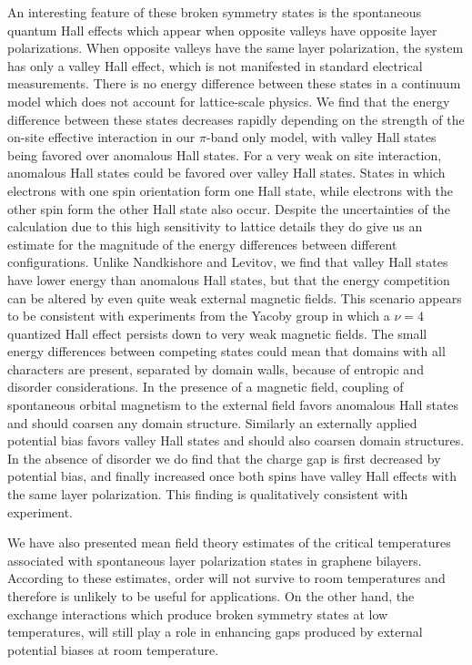 \documentclass[twocolumn,prb,showpacs,preprintnumbers,amsmath,amssymb]{revtex4}
\begin{document}
An interesting feature of these broken symmetry states is the spontaneous quantum 
Hall effects which appear when opposite valleys have opposite layer polarizations.\cite{xiaofan}
When opposite valleys have the same layer polarization, the system has only a valley Hall effect, which is not manifested in standard electrical measurements.  There is no energy difference between these states in a continuum model which does not account for lattice-scale physics.  We find that the energy difference between these states decreases rapidly depending on the strength of the on-site effective interaction in our $\pi$-band only model, with valley Hall states being favored over anomalous Hall states.  For a very weak on site interaction, anomalous Hall states could be favored over valley Hall states.  States in which electrons with one spin orientation form one Hall state, while electrons with the other spin form the other Hall state also occur.  
Despite the uncertainties of the calculation due to this high sensitivity to lattice details
they do give us an estimate for the magnitude of the energy differences between different configurations.
Unlike Nandkishore and Levitov, \cite{nandkishore2} we find that valley Hall states have lower energy than anomalous Hall states, but that the energy competition can be altered by even quite weak external magnetic fields.  This scenario appears to be consistent with experiments from the Yacoby group in which a $\nu=4$ quantized Hall effect persists down to very weak magnetic fields.   The small energy differences between competing states could mean that domains with all characters are present, separated by domain walls,  because of entropic and disorder considerations.  In the presence of a magnetic field, coupling of spontaneous orbital magnetism to the external field favors anomalous Hall states and should coarsen any domain structure.  Similarly an externally applied potential bias favors valley Hall states and should also coarsen domain structures.   In the absence of disorder we do find that the charge gap is first decreased by potential bias, and finally increased once both spins have valley Hall effects with the same layer polarization.  This finding is qualitatively consistent with experiment.   
\cite{yacoby_latest}



We have also presented mean field theory estimates of the critical temperatures associated with spontaneous layer polarization states in graphene bilayers.
According to these estimates,  order will not survive to room temperatures and therefore is unlikely to be useful for applications.  On the other hand, the exchange interactions which produce broken symmetry states at low temperatures, will still play a role in enhancing gaps produced by external 
potential biases at room temperature.
\end{document}
